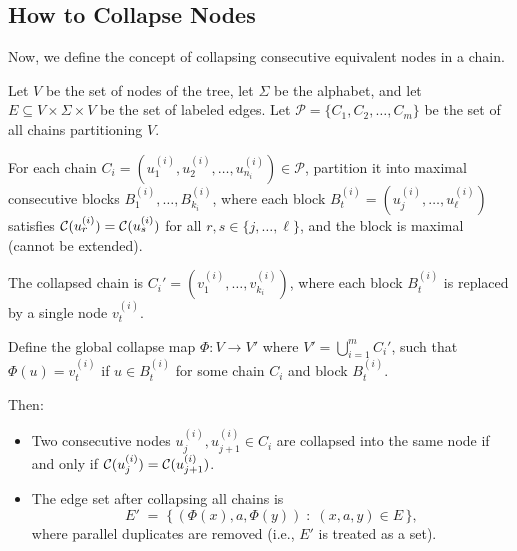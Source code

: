 \subsection{How to Collapse Nodes}
Now, we define the concept of collapsing consecutive equivalent nodes in a chain.
\begin{definition}
    \label{def:collapsing}
    Let $V$ be the set of nodes of the tree, let $\Sigma$ be the alphabet, and let $E \subseteq V \times \Sigma \times V$ be the set of labeled edges.
    Let $\mathcal{P} = \{C_1, C_2, \ldots, C_m\}$ be the set of all chains partitioning $V$.
    
    For each chain $C_i = (u_1^{(i)}, u_2^{(i)}, \ldots, u_{n_i}^{(i)}) \in \mathcal{P}$, partition it into maximal consecutive blocks $B_1^{(i)}, \ldots, B_{k_i}^{(i)}$, where each block $B_t^{(i)} = (u_j^{(i)}, \ldots, u_\ell^{(i)})$ satisfies $\mathcal{C}(u_r^{(i)}) = \mathcal{C}(u_s^{(i)})$ for all $r,s \in \{j,\ldots,\ell\}$, and the block is maximal (cannot be extended).

    The collapsed chain is $C_i' = (v_1^{(i)}, \ldots, v_{k_i}^{(i)})$, where each block $B_t^{(i)}$ is replaced by a single node $v_t^{(i)}$.
    
    Define the global collapse map $\Phi: V \to V'$ where $V' = \bigcup_{i=1}^m C_i'$, such that $\Phi(u) = v_t^{(i)}$ if $u \in B_t^{(i)}$ for some chain $C_i$ and block $B_t^{(i)}$.
    
    Then:
    \begin{itemize}[leftmargin=25pt]
        \item Two consecutive nodes $u_j^{(i)}, u_{j+1}^{(i)} \in C_i$ are collapsed into the same node if and only if $\mathcal{C}(u_j^{(i)}) = \mathcal{C}(u_{j+1}^{(i)})$.
        \item The edge set after collapsing all chains is
        \[
            E' \;=\; \{\, (\Phi(x), a, \Phi(y)) \;:\; (x,a,y) \in E \,\},
        \]
        where parallel duplicates are removed (i.e., $E'$ is treated as a set).
    \end{itemize}
\end{definition}

